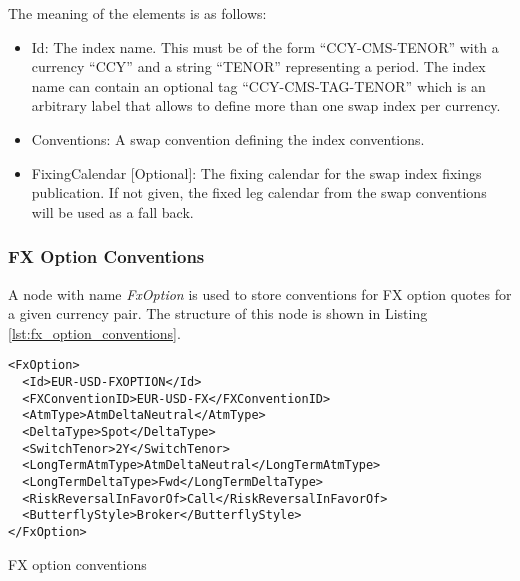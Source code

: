 The meaning of the elements is as follows:

\begin{itemize}
\item Id: The index name. This must be of the form ``CCY-CMS-TENOR'' with a currency ``CCY'' and a string ``TENOR''
  representing a period. The index name can contain an optional tag ``CCY-CMS-TAG-TENOR'' which is an arbitrary label
  that allows to define more than one swap index per currency.
\item Conventions: A swap convention defining the index conventions.
\item FixingCalendar [Optional]: The fixing calendar for the swap index fixings publication. If not given, the fixed leg
  calendar from the swap conventions will be used as a fall back.
\end{itemize}

\subsubsection{FX Option Conventions}\label{sss:fx_option_conv}
A node with name \emph{FxOption} is used to store conventions for FX option quotes for a given currency pair. The 
structure of this node is shown in Listing \ref{lst:fx_option_conventions}. 
 
\begin{listing}[H] 
\begin{verbatim}
<FxOption>
  <Id>EUR-USD-FXOPTION</Id>
  <FXConventionID>EUR-USD-FX</FXConventionID>
  <AtmType>AtmDeltaNeutral</AtmType>
  <DeltaType>Spot</DeltaType>
  <SwitchTenor>2Y</SwitchTenor>
  <LongTermAtmType>AtmDeltaNeutral</LongTermAtmType>
  <LongTermDeltaType>Fwd</LongTermDeltaType>
  <RiskReversalInFavorOf>Call</RiskReversalInFavorOf>
  <ButterflyStyle>Broker</ButterflyStyle>
</FxOption>
\end{verbatim} 
\caption{FX option conventions} 
\label{lst:fx_option_conventions} 
\end{listing} 
 
